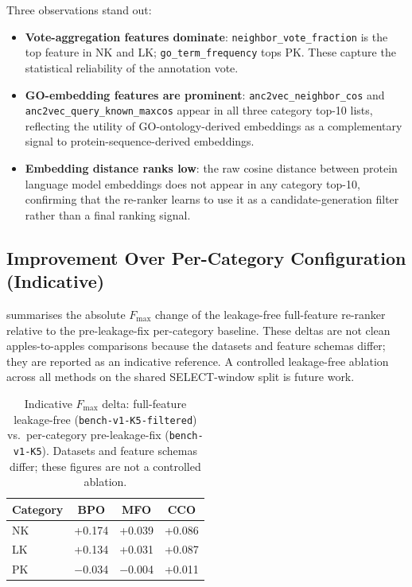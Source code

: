 Three observations stand out:
\begin{itemize}
  \item \textbf{Vote-aggregation features dominate}: \texttt{neighbor\_vote\_fraction}
    is the top feature in NK and LK; \texttt{go\_term\_frequency} tops PK. These
    capture the statistical reliability of the annotation vote.
  \item \textbf{GO-embedding features are prominent}: \texttt{anc2vec\_neighbor\_cos}
    and \texttt{anc2vec\_query\_known\_maxcos} appear in all three category
    top-10 lists, reflecting the utility of GO-ontology-derived embeddings as a
    complementary signal to protein-sequence-derived embeddings.
  \item \textbf{Embedding distance ranks low}: the raw cosine distance between
    protein language model embeddings does not appear in any category top-10,
    confirming that the re-ranker learns to use it as a candidate-generation
    filter rather than a final ranking signal.
\end{itemize}

\subsection{Improvement Over Per-Category Configuration (Indicative)}

 summarises the absolute $F_{\max}$ change of the
leakage-free full-feature re-ranker relative to the pre-leakage-fix per-category
baseline. These deltas are not clean apples-to-apples comparisons because the
datasets and feature schemas differ; they are reported as an indicative reference.
A controlled leakage-free ablation across all methods on the shared
SELECT-window split is future work.

\begin{table}[htbp]
  \centering
  \caption[Indicative Fmax delta: full-feature (leakage-free) vs.\ per-category (pre-leakage-fix)]{%
    Indicative $F_{\max}$ delta: full-feature leakage-free (\texttt{bench-v1-K5-filtered})
    vs.\ per-category pre-leakage-fix (\texttt{bench-v1-K5}). Datasets and feature
    schemas differ; these figures are not a controlled ablation.}
  \label{tab:improvement}
  \begin{tabular}{lccc}
    \toprule
    \textbf{Category} & \textbf{BPO} & \textbf{MFO} & \textbf{CCO} \\
    \midrule
    NK & +0.174 & +0.039 & +0.086 \\
    LK & +0.134 & +0.031 & +0.087 \\
    PK & $-$0.034 & $-$0.004 & +0.011 \\
    \bottomrule
  \end{tabular}
\end{table}

